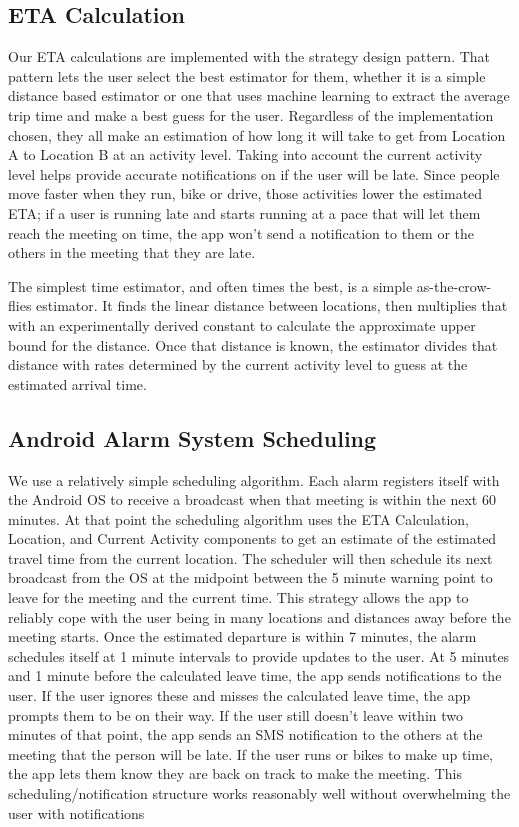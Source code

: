 \subsection{ETA Calculation}
Our ETA calculations are implemented with the strategy design pattern.  That pattern lets the user select the best estimator for them, whether it is a simple distance based estimator or one that uses machine learning to extract the average trip time and make a best guess for the user. Regardless of the implementation chosen, they all make an estimation of how long it will take to get from Location A to Location B at an activity level. Taking into account the current activity level helps provide accurate notifications on if the user will be late. Since people move faster when they run, bike or drive, those activities lower the estimated ETA; if a user is running late and starts running at a pace that will let them reach the meeting on time, the app won't send a notification to them or the others in the meeting that they are late. 

The simplest time estimator, and often times the best, is a simple as-the-crow-flies estimator. It finds the linear distance between locations, then multiplies that with an experimentally derived constant to calculate the approximate upper bound for the distance.  Once that distance is known, the estimator divides that distance with rates determined by the current activity level to guess at the estimated arrival time.

\subsection{Android Alarm System Scheduling}
We use a relatively simple scheduling algorithm. Each alarm registers itself with the Android OS to receive a broadcast when that meeting is within the next 60 minutes. At that point the scheduling algorithm uses the ETA Calculation, Location, and Current Activity components to get an estimate of the estimated travel time from the current location. The scheduler will then schedule its next broadcast from the OS at the midpoint between the 5 minute warning point to leave for the meeting and the current time. This strategy allows the app to reliably cope with the user being in many locations and distances away before the meeting starts.  Once the estimated departure is within 7 minutes, the alarm schedules itself at 1 minute intervals to provide updates to the user. At 5 minutes and 1 minute before the calculated leave time, the app sends notifications to the user. If the user ignores these and misses the calculated leave time, the app prompts them to be on their way. If the user still doesn't leave within two minutes of that point, the app sends an SMS notification to the others at the meeting that the person will be late. If the user runs or bikes to make up time, the app lets them know they are back on track to make the meeting. This scheduling/notification structure works reasonably well without overwhelming the user with notifications 